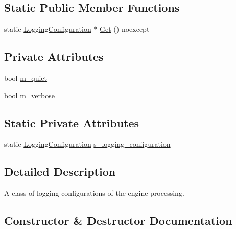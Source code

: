 \subsection*{Static Public Member Functions}
\begin{DoxyCompactItemize}
\item 
static \hyperlink{classmage_1_1_logging_configuration}{Logging\+Configuration} $\ast$ \hyperlink{classmage_1_1_logging_configuration_a9a2b9343e49bd5befe10cf06225e5c83}{Get} () noexcept
\end{DoxyCompactItemize}
\subsection*{Private Attributes}
\begin{DoxyCompactItemize}
\item 
bool \hyperlink{classmage_1_1_logging_configuration_a38f457d5db84d15e008841ca8653b47c}{m\+\_\+quiet}
\item 
bool \hyperlink{classmage_1_1_logging_configuration_a60f052c2bb702d8153188e93f00427ac}{m\+\_\+verbose}
\end{DoxyCompactItemize}
\subsection*{Static Private Attributes}
\begin{DoxyCompactItemize}
\item 
static \hyperlink{classmage_1_1_logging_configuration}{Logging\+Configuration} \hyperlink{classmage_1_1_logging_configuration_a056b2250472f997de3d99dcfc3c02940}{s\+\_\+logging\+\_\+configuration}
\end{DoxyCompactItemize}


\subsection{Detailed Description}
A class of logging configurations of the engine processing. 

\subsection{Constructor \& Destructor Documentation}
\hypertarget{classmage_1_1_logging_configuration_ab18d18c78e7104f4c677e6d08f31ca01}{}\label{classmage_1_1_logging_configuration_ab18d18c78e7104f4c677e6d08f31ca01} 
